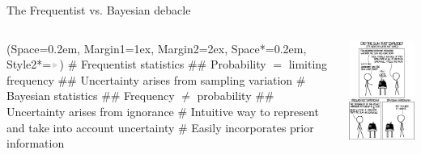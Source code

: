 \documentclass[12pt, aspectratio=149]{beamer}
\newcommand{\listSpace}{0.2em}
\theoremstyle{plain}
\begin{document}
\begin{frame}[fragile]{The Frequentist vs. Bayesian debacle}
	\begin{columns}
		\begin{column}{0.7\linewidth}
			\begin{easylist}[itemize]
				\ListProperties(Space=\listSpace, Margin1=1ex, Margin2=2ex, Space*=\listSpace, Style2*=$\color{bggraydark}\blacktriangleright$\space)
				# Frequentist statistics
				## Probability $=$ limiting frequency
				## Uncertainty arises from sampling variation
				# Bayesian statistics
				## Frequency $\neq$ probability
				## Uncertainty arises from ignorance
				# Intuitive way to represent and take into account uncertainty
				# Easily incorporates prior information
			\end{easylist}
		\end{column}
		\begin{column}{0.3\textwidth}
			\includegraphics[height=0.7\textheight]{figs/relevant_xkcd.png}
		\end{column}
	\end{columns}
\end{frame}
\end{document}
